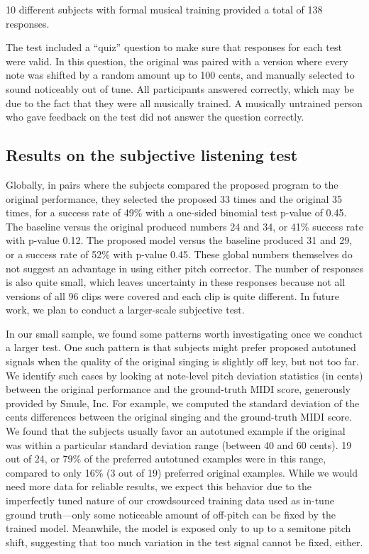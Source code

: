 10 different subjects with formal musical training provided a total of 138 responses. 

The test included a ``quiz'' question to make sure that responses for each test were valid. In this question, the original was paired with a version where every note was shifted by a random amount up to 100 cents, and manually selected to sound noticeably out of tune. All participants answered correctly, which may be due to the fact that they were all musically trained. A musically untrained person who gave feedback on the test did not answer the question correctly.

\subsection{Results on the subjective listening test}
\label{sec:subjective-results}
Globally, in pairs where the subjects compared the proposed program to the original performance, they selected the proposed 33 times and the original 35 times, for a success rate of 49\% with a one-sided binomial test p-value of 0.45. The baseline versus the original produced numbers 24 and 34, or 41\% success rate with p-value 0.12. The proposed model versus the baseline produced 31 and 29, or a success rate of 52\% with p-value 0.45. These global numbers themselves do not suggest an advantage in using either pitch corrector. The number of responses is also quite small, which leaves uncertainty in these responses because not all versions of all 96 clips were covered and each clip is quite different. In future work, we plan to conduct a larger-scale subjective test.

In our small sample, we found some patterns worth investigating once we conduct a larger test. One such pattern is that subjects might prefer proposed autotuned signals when the quality of the original singing is slightly off key, but not too far. We identify such cases by looking at note-level pitch deviation statistics (in cents) between the original performance and the ground-truth MIDI score, generously provided by Smule, Inc. For example, we computed the standard deviation of the cents differences between the original singing and the ground-truth MIDI score. We found that the subjects usually favor an autotuned example if the original was within a particular standard deviation range (between 40 and 60 cents). 19 out of 24, or 79\% of the preferred autotuned examples were in this range, compared to only 16\% (3 out of 19) preferred original examples. While we would need more data for reliable results, we expect this behavior due to the imperfectly tuned nature of our crowdsourced training data used as in-tune ground truth---only some noticeable amount of off-pitch can be fixed by the trained model. Meanwhile, the model is exposed only to up to a semitone pitch shift, suggesting that too much variation in the test signal cannot be fixed, either. 

